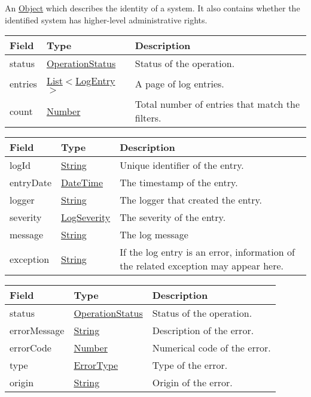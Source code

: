 \documentclass[a4paper]{arrowhead}
\newcommand{\pref}[1]{{\textcolor{ArrowheadGrey}{\hyperref[sec:model:primitives:#1]{#1}}}}
\begin{document}
An \pref{Object} which describes the identity of a system. It also contains whether the identified system has higher-level administrative rights.


\begin{table}[ht!]
\begin{tabularx}{\textwidth}{| p{2.5cm} | p{2.5cm} | X |} \hline
\rowcolor{gray!33} Field & Type      & Description \\ \hline
status & \pref{OperationStatus} & Status of the operation. \\ \hline
entries & \pref{List}$<$\hyperref[sec:model:LogEntry]{LogEntry}$>$ & A page of log entries. \\ \hline
count & \pref{Number} & Total number of entries that match the filters. \\ \hline
\end{tabularx}
\end{table}

\clearpage

 
\begin{table}[ht!]
\begin{tabularx}{\textwidth}{| p{2.5cm} | p{2.5cm} | X |} \hline
\rowcolor{gray!33} Field & Type      & Description \\ \hline
logId & \pref{String} & Unique identifier of the entry. \\ \hline
entryDate & \pref{DateTime} & The timestamp of the entry. \\ \hline
logger & \pref{String} & The logger that created the entry. \\ \hline
severity & \pref{LogSeverity} & The severity of the entry. \\ \hline
message & \pref{String} & The log message \\ \hline
exception & \pref{String} & If the log entry is an error, information of the related exception may appear here. \\ \hline
\end{tabularx}
\end{table}


\begin{table}[ht!]
\begin{tabularx}{\textwidth}{| p{2.5cm} | p{3cm} | X |} \hline
\rowcolor{gray!33} Field & Type      & Description \\ \hline
status & \pref{OperationStatus} & Status of the operation. \\ \hline
errorMessage & \pref{String} & Description of the error. \\ \hline
errorCode &\pref{Number}  & Numerical code of the error. \\ \hline
type & \pref{ErrorType} & Type of the error. \\ \hline
origin & \pref{String} & Origin of the error. \\ \hline
\end{tabularx}
\end{table}
\end{document}
